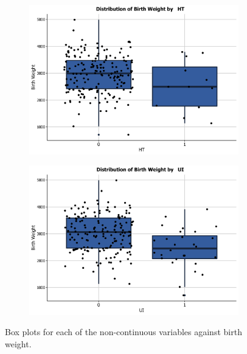 \begin{figure}[!htb]
        \begin{subfigure}[b]{0.4\textwidth}   
            \centering 
            \includegraphics[width=\linewidth]{Images/HT.png}
            \label{fig:BWTvsHT}
        \end{subfigure}
        \quad
        \begin{subfigure}[b]{0.4\textwidth}   
            \centering 
            \includegraphics[width=\linewidth]{Images/UI.png}
            \label{fig:BWTvsUI}
        \end{subfigure}
        \caption[ The average and standard deviation of critical parameters ]
        {\small Box plots for each of the non-continuous variables against birth weight.} 
        \label{fig:Non-continuous}
    \end{figure}

